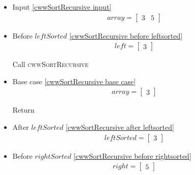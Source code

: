 \begin{frame}[containsverbatim]{\cwwalgortihmexampleframe}
\begin{columns}[c]
\begin{column}{0.65\textwidth}
{\begin{minipage}[c]{\textwidth}
\begin{multicols}{3}
\begin{itemize}
                                    Call \textsc{cwwSortRecursive}
        
                                    \item Input \cref{cwwSortRecursive input}
                                    \begin{align*}
                                        array = \begin{bmatrix}3 & 5\end{bmatrix}
                                    \end{align*}
        
                                    \item Before $leftSorted$ \cref{cwwSortRecursive before leftsorted}
                                    \begin{align*}
                                        left = \begin{bmatrix}3\end{bmatrix}
                                    \end{align*}
        
                                    Call \textsc{cwwSortRecursive}
        
                                    \item Base case \cref{cwwSortRecursive base case}
                                    \begin{align*}
                                        array = \begin{bmatrix}3\end{bmatrix}
                                    \end{align*}
        
                                    Return
        
                                    \item After $leftSorted$ \cref{cwwSortRecursive after leftsorted}
                                    \begin{align*}
                                        leftSorted = \begin{bmatrix}3\end{bmatrix}
                                    \end{align*}
        
                                    \item Before $rightSorted$ \cref{cwwSortRecursive before rightsorted}
                                    \begin{align*}
                                        right = \begin{bmatrix}5\end{bmatrix}
                                    \end{align*}
        

\end{itemize}
\end{multicols}
\end{minipage}}
\end{column}
\end{columns}
\end{frame}
